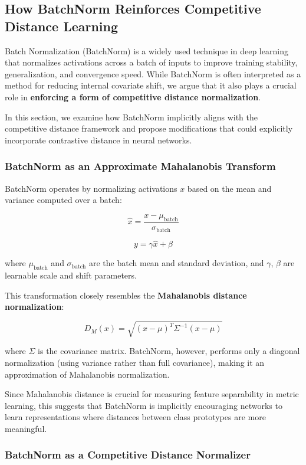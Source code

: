 \subsection{How BatchNorm Reinforces Competitive Distance Learning}

Batch Normalization (BatchNorm) is a widely used technique in deep learning that normalizes activations across a batch of inputs to improve training stability, generalization, and convergence speed. While BatchNorm is often interpreted as a method for reducing internal covariate shift, we argue that it also plays a crucial role in \textbf{enforcing a form of competitive distance normalization}. 

In this section, we examine how BatchNorm implicitly aligns with the competitive distance framework and propose modifications that could explicitly incorporate contrastive distance in neural networks.

\subsubsection{BatchNorm as an Approximate Mahalanobis Transform}

BatchNorm operates by normalizing activations \( x \) based on the mean and variance computed over a batch:

\[
\hat{x} = \frac{x - \mu_{\text{batch}}}{\sigma_{\text{batch}}}
\]

\[
y = \gamma \hat{x} + \beta
\]

where \( \mu_{\text{batch}} \) and \( \sigma_{\text{batch}} \) are the batch mean and standard deviation, and \( \gamma \), \( \beta \) are learnable scale and shift parameters.

This transformation closely resembles the \textbf{Mahalanobis distance normalization}:

\[
D_M(x) = \sqrt{(x - \mu)^T \Sigma^{-1} (x - \mu)}
\]

where \( \Sigma \) is the covariance matrix. BatchNorm, however, performs only a diagonal normalization (using variance rather than full covariance), making it an approximation of Mahalanobis normalization. 

Since Mahalanobis distance is crucial for measuring feature separability in metric learning, this suggests that BatchNorm is implicitly encouraging networks to learn representations where distances between class prototypes are more meaningful.

\subsubsection{BatchNorm as a Competitive Distance Normalizer}

